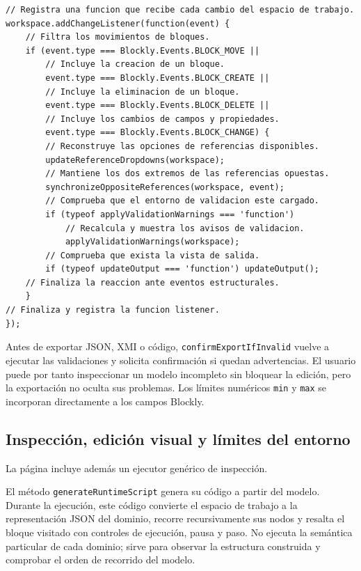 \begin{lstlisting}[style=tfmjavascript, caption={Actualización reactiva del editor generado comentada línea a línea}, label={lst:listener-runtime-blockly}]
// Registra una funcion que recibe cada cambio del espacio de trabajo.
workspace.addChangeListener(function(event) {
    // Filtra los movimientos de bloques.
    if (event.type === Blockly.Events.BLOCK_MOVE ||
        // Incluye la creacion de un bloque.
        event.type === Blockly.Events.BLOCK_CREATE ||
        // Incluye la eliminacion de un bloque.
        event.type === Blockly.Events.BLOCK_DELETE ||
        // Incluye los cambios de campos y propiedades.
        event.type === Blockly.Events.BLOCK_CHANGE) {
        // Reconstruye las opciones de referencias disponibles.
        updateReferenceDropdowns(workspace);
        // Mantiene los dos extremos de las referencias opuestas.
        synchronizeOppositeReferences(workspace, event);
        // Comprueba que el entorno de validacion este cargado.
        if (typeof applyValidationWarnings === 'function')
            // Recalcula y muestra los avisos de validacion.
            applyValidationWarnings(workspace);
        // Comprueba que exista la vista de salida.
        if (typeof updateOutput === 'function') updateOutput();
    // Finaliza la reaccion ante eventos estructurales.
    }
// Finaliza y registra la funcion listener.
});
\end{lstlisting}

Antes de exportar JSON, XMI o código, \texttt{confirmExportIfInvalid} vuelve a
ejecutar las validaciones y solicita confirmación si quedan advertencias. El
usuario puede por tanto inspeccionar un modelo incompleto sin bloquear la
edición, pero la exportación no oculta sus problemas. Los límites numéricos
\texttt{min} y \texttt{max} se incorporan directamente a los campos Blockly.

\subsection{Inspección, edición visual y límites del entorno}

La página incluye además un ejecutor genérico de inspección.

El método \texttt{generateRuntimeScript} genera su código a partir del modelo.
Durante la ejecución, este código convierte el espacio de trabajo a la
representación JSON del dominio, recorre recursivamente sus nodos y resalta el bloque visitado
con controles de ejecución, pausa y paso. No ejecuta la semántica particular de
cada dominio; sirve para observar la estructura construida y comprobar el orden
de recorrido del modelo.

